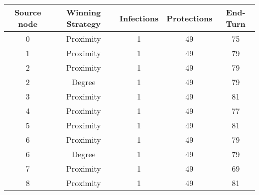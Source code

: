 \documentclass[results.tex]{subfiles}
\begin{document}
    \begin{center}
        \begin{tabular}{| c || c | c | c | c |}
            \hline
            {\bfseries Source node} & {\bfseries Winning Strategy} & {\bfseries Infections} & {\bfseries Protections}
            & {\bfseries End-Turn}
            \\  %
            \hline\hline
            0                       & Proximity                    & 1                      & 49                      & 75                   \\
            \hline
            1                       & Proximity                    & 1                      & 49                      & 79                   \\
            \hline
            2                       & Proximity                    & 1                      & 49                      & 79                   \\
            \hline
            2                       & Degree                       & 1                      & 49                      & 79                   \\
            \hline
            3                       & Proximity                    & 1                      & 49                      & 81                   \\
            \hline
            4                       & Proximity                    & 1                      & 49                      & 77                   \\
            \hline
            5                       & Proximity                    & 1                      & 49                      & 81                   \\
            \hline
            6                       & Proximity                    & 1                      & 49                      & 79                   \\
            \hline
            6                       & Degree                       & 1                      & 49                      & 79                   \\
            \hline
            7                       & Proximity                    & 1                      & 49                      & 69                   \\
            \hline
            8                       & Proximity                    & 1                      & 49                      & 81                   \\

\end{tabular}
\end{center}
\end{document}
